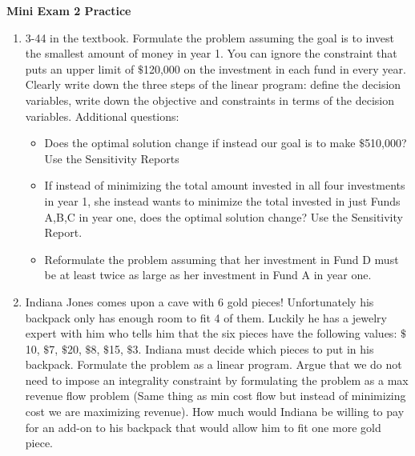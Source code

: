 \documentclass{article}[11 pt]    %
\begin{document}
\begin{center}
\textbf{Mini Exam 2 Practice}\\[.1cm]
\end{center}

\begin{enumerate}
\item 3-44 in the textbook.  Formulate the problem assuming the goal is to invest the smallest amount of money in year 1.  You can ignore the constraint that puts an upper limit of $\$$120,000 on the investment in each fund in every year.  Clearly write down the three steps of the linear program: define the decision variables, write down the objective and constraints in terms of the decision variables.
Additional questions:
\begin{itemize}
\item Does the optimal solution change if instead our goal is to make $\$$510,000? Use the Sensitivity Reports
\item If instead of minimizing the total amount invested in all four investments in year 1, she instead wants to minimize the total invested in just Funds A,B,C in year one, does the optimal solution change? Use the Sensitivity Report.
\item Reformulate the problem assuming that her investment in Fund D must be at least twice as large as her investment in Fund A in year one.
\end{itemize}
\item Indiana Jones comes upon a cave with 6 gold pieces!  Unfortunately his backpack only has enough room to fit 4 of them.  Luckily he has a jewelry expert with him who tells him that the six pieces have the following values: $\$$10, $\$$7, $\$$20, $\$$8, $\$$15, $\$$3.  Indiana must decide which pieces to put in his backpack.  Formulate the problem as a linear program.  Argue that we do not need to impose an integrality constraint by formulating the problem as a max revenue flow problem (Same thing as min cost flow but instead of minimizing cost we are maximizing revenue).  How much would Indiana be willing to pay for an add-on to his backpack that would allow him to fit one more gold piece.
\end{enumerate}
\end{document}
